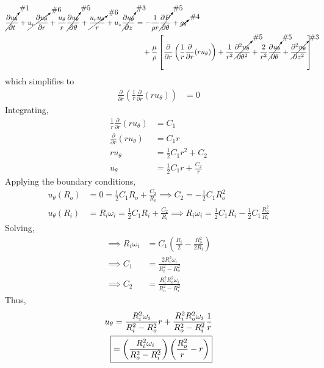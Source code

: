 \begin{align*}
    \cancelto{\text{\#1}}{\frac{\partial u_{\theta}}{\partial t}} + \cancelto{\text{\#6}}{u_r \frac{\partial u_{\theta}}{\partial r}} + \frac{u_{\theta}}{r} \cancelto{\text{\#5}}{\frac{\partial u_{\theta}}{\partial \theta}} + \cancelto{\text{\#6}}{\frac{u_r u_{\theta}}{r}} + u_z \cancelto{\text{\#3}}{\frac{\partial u_{\theta}}{\partial z}} &= -\frac{1}{\rho r} \cancelto{\text{\#5}}{\frac{\partial P}{\partial \theta}} + \cancelto{\text{\#4}}{g_{\theta}} \\
    &\quad + \frac{\mu}{\rho} \left[\frac{\partial}{\partial r}\left(\frac{1}{r}\frac{\partial}{\partial r}(r u_{\theta})\right) + \frac{1}{r^2} \cancelto{\text{\#5}}{\frac{\partial^2 u_{\theta}}{\partial \theta^2}} + \frac{2}{r^2} \cancelto{\text{\#5}}{\frac{\partial u_{\theta}}{\partial \theta}} + \cancelto{\text{\#3}}{\frac{\partial^2 u_{\theta}}{\partial z^2}}\right]
\end{align*}
which simplifies to
\begin{align*}
    \frac{\partial}{\partial r}\left(\frac{1}{r}\frac{\partial}{\partial r}(r u_{\theta})\right) &= 0
\end{align*}
Integrating,
\begin{align*}
    \frac{1}{r}\frac{\partial}{\partial r}(r u_{\theta}) &= C_1 \\
    \frac{\partial}{\partial r}(r u_{\theta}) &= C_1 r \\
    r u_{\theta} &= \frac{1}{2} C_1 r^2 + C_2 \\
    u_{\theta} &= \frac{1}{2} C_1 r + \frac{C_2}{r}
\end{align*}
Applying the boundary conditions,
\begin{align*}
    u_{\theta}(R_o) &= 0 = \frac{1}{2} C_1 R_o + \frac{C_2}{R_o} \implies C_2 = -\frac{1}{2} C_1 R_o^2 \\
    u_{\theta}(R_i) &= R_i \omega_i = \frac{1}{2} C_1 R_i + \frac{C_2}{R_i} \implies R_i \omega_i = \frac{1}{2} C_1 R_i - \frac{1}{2} C_1 \frac{R_o^2}{R_i}
\end{align*}
Solving,
\begin{align*}
    \implies R_i \omega_i &= C_1 \left(\frac{R_i}{2} - \frac{R_o^2}{2R_i}\right) \\
    \implies C_1 &= \frac{2 R_i^2 \omega_i}{R_i^2 - R_o^2} \\
    \implies C_2 &= \frac{R_i^2 R_o^2 \omega_i}{R_o^2 - R_i^2}
\end{align*}
Thus,
\begin{align*}
    u_{\theta} &= \frac{R_i^2 \omega_i}{R_i^2 - R_o^2} r + \frac{R_i^2 R_o^2 \omega_i}{R_o^2 - R_i^2} \frac{1}{r} \\
    \Aboxed{&= \left(\frac{R_i^2 \omega_i}{R_o^2 - R_i^2}\right) \left(\frac{R_o^2}{r} - r\right)}
\end{align*}
